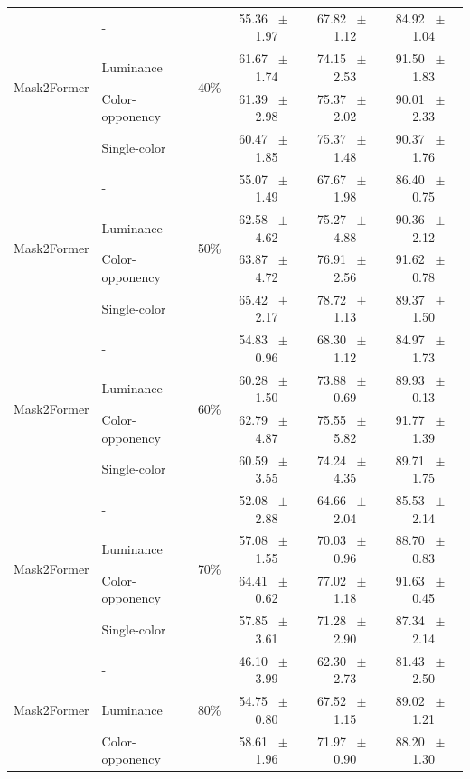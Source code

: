 \begin{table}[h]
\begin{tabular}{@{}l l c c c c@{}}
    \multirow{4}{*}{Mask2Former} & - & \multirow{4}{*}{40\%} & 55.36 ~$\pm$~ 1.97 & 67.82 ~$\pm$~ 1.12 & 84.92 ~$\pm$~ 1.04 \\
    & Luminance &  & 61.67 ~$\pm$~ 1.74 & 74.15 ~$\pm$~ 2.53 & 91.50 ~$\pm$~ 1.83 \\
    & Color-opponency &  & 61.39 ~$\pm$~ 2.98 & 75.37 ~$\pm$~ 2.02 & 90.01 ~$\pm$~ 2.33 \\
    & Single-color &  & 60.47 ~$\pm$~ 1.85 & 75.37 ~$\pm$~ 1.48 & 90.37 ~$\pm$~ 1.76 \\
    \midrule
    \multirow{4}{*}{Mask2Former} & - & \multirow{4}{*}{50\%} & 55.07 ~$\pm$~ 1.49 & 67.67 ~$\pm$~ 1.98 & 86.40 ~$\pm$~ 0.75 \\
    & Luminance &  & 62.58 ~$\pm$~ 4.62 & 75.27 ~$\pm$~ 4.88 & 90.36 ~$\pm$~ 2.12 \\
    & Color-opponency &  & 63.87 ~$\pm$~ 4.72 & 76.91 ~$\pm$~ 2.56 & 91.62 ~$\pm$~ 0.78 \\
    & Single-color &  & 65.42 ~$\pm$~ 2.17 & 78.72 ~$\pm$~ 1.13 & 89.37 ~$\pm$~ 1.50 \\
    \midrule
    \multirow{4}{*}{Mask2Former} & - & \multirow{4}{*}{60\%} & 54.83 ~$\pm$~ 0.96 & 68.30 ~$\pm$~ 1.12 & 84.97 ~$\pm$~ 1.73 \\
    & Luminance &  & 60.28 ~$\pm$~ 1.50 & 73.88 ~$\pm$~ 0.69 & 89.93 ~$\pm$~ 0.13 \\
    & Color-opponency &  & 62.79 ~$\pm$~ 4.87 & 75.55 ~$\pm$~ 5.82 & 91.77 ~$\pm$~ 1.39 \\
    & Single-color &  & 60.59 ~$\pm$~ 3.55 & 74.24 ~$\pm$~ 4.35 & 89.71 ~$\pm$~ 1.75 \\
    \midrule
    \multirow{4}{*}{Mask2Former} & - & \multirow{4}{*}{70\%} & 52.08 ~$\pm$~ 2.88 & 64.66 ~$\pm$~ 2.04 & 85.53 ~$\pm$~ 2.14 \\
    & Luminance &  & 57.08 ~$\pm$~ 1.55 & 70.03 ~$\pm$~ 0.96 & 88.70 ~$\pm$~ 0.83 \\
    & Color-opponency &  & 64.41 ~$\pm$~ 0.62 & 77.02 ~$\pm$~ 1.18 & 91.63 ~$\pm$~ 0.45 \\
    & Single-color &  & 57.85 ~$\pm$~ 3.61 & 71.28 ~$\pm$~ 2.90 & 87.34 ~$\pm$~ 2.14 \\
    \midrule
    \multirow{4}{*}{Mask2Former} & - & \multirow{4}{*}{80\%} & 46.10 ~$\pm$~ 3.99 & 62.30 ~$\pm$~ 2.73 & 81.43 ~$\pm$~ 2.50 \\
    & Luminance &  & 54.75 ~$\pm$~ 0.80 & 67.52 ~$\pm$~ 1.15 & 89.02 ~$\pm$~ 1.21 \\
    & Color-opponency &  & 58.61 ~$\pm$~ 1.96 & 71.97 ~$\pm$~ 0.90 & 88.20 ~$\pm$~ 1.30 \\

\end{tabular}
\end{table}
